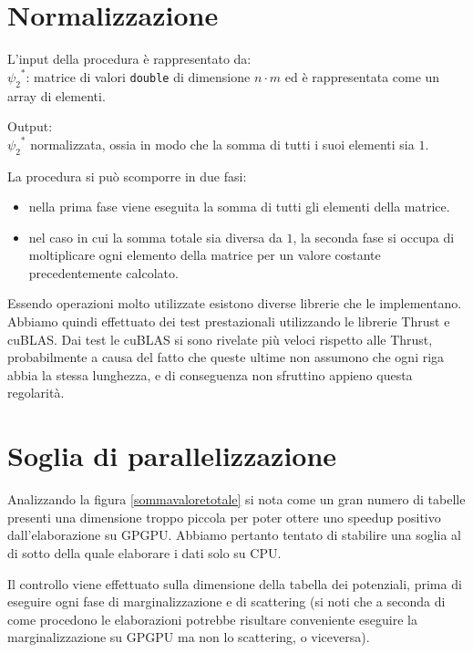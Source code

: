 \documentclass[a4paper]{article}   %
\begin{document}
\section{Normalizzazione}

L'input della procedura è rappresentato da:\\
${\psi_2}^{*}$: matrice di valori {\tt double} di dimensione $n \cdot m$ ed è rappresentata come un array di elementi.

Output:\\
${\psi_2}^{*}$ normalizzata, ossia in modo che la somma di tutti i suoi elementi sia $1$.

La procedura si può scomporre in due fasi:
\begin{itemize}
\item nella prima fase viene eseguita la somma di tutti gli elementi della matrice.
\item nel caso in cui la somma totale sia diversa da $1$, la seconda fase si occupa di moltiplicare ogni elemento della matrice per un valore costante precedentemente calcolato.
\end{itemize}
Essendo operazioni molto utilizzate esistono diverse librerie che le implementano. Abbiamo quindi effettuato dei test prestazionali utilizzando le librerie Thrust e cuBLAS.
Dai test le cuBLAS si sono rivelate più veloci rispetto alle Thrust, probabilmente a causa del fatto che queste ultime non assumono che ogni riga abbia la stessa lunghezza, e di conseguenza non sfruttino appieno questa regolarità.

\section{Soglia di parallelizzazione}\label{sogliaparallelizzazione}
Analizzando la figura \ref{sommavaloretotale} si nota come un gran numero di tabelle presenti una dimensione troppo piccola per poter ottere uno speedup positivo dall'elaborazione su GPGPU.
Abbiamo pertanto tentato di stabilire una soglia al di sotto della quale elaborare i dati solo su CPU. 

Il controllo viene effettuato sulla dimensione della tabella dei potenziali, prima di eseguire ogni fase di marginalizzazione e di scattering (si noti che a seconda di come procedono le elaborazioni potrebbe risultare conveniente eseguire la marginalizzazione su GPGPU ma non lo scattering, o viceversa).
\end{document}
